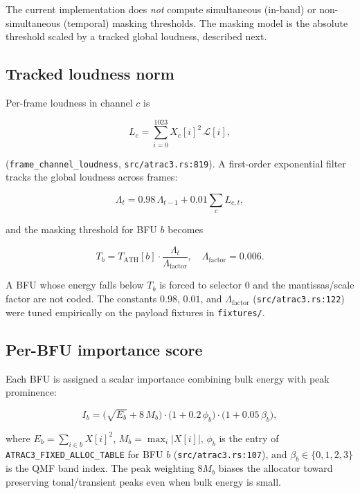 \documentclass[11pt]{article}
\begin{document}
The current implementation does \emph{not} compute simultaneous (in-band) or
non-simultaneous (temporal) masking thresholds. The masking model is the
absolute threshold scaled by a tracked global loudness, described next.

\subsection{Tracked loudness norm}

Per-frame loudness in channel \(c\) is

\begin{equation}
    L_c = \sum_{i=0}^{1023} X_c[i]^2 \,\mathcal{L}[i],
\end{equation}

\noindent
(\texttt{frame\_channel\_loudness}, \texttt{src/atrac3.rs:819}). A first-order
exponential filter tracks the global loudness across frames:

\begin{equation}
    \Lambda_t = 0.98\,\Lambda_{t-1} + 0.01 \sum_c L_{c,t},
\end{equation}

\noindent
and the masking threshold for BFU \(b\) becomes

\begin{equation}
    T_b = T_{\text{ATH}}[b] \cdot \frac{\Lambda_t}{\Lambda_{\text{factor}}},
    \quad \Lambda_{\text{factor}} = 0.006.
    \label{eq:masking}
\end{equation}

\noindent
A BFU whose energy falls below \(T_b\) is forced to selector \(0\) and the
mantissas/scale factor are not coded. The constants \(0.98\), \(0.01\), and
\(\Lambda_{\text{factor}}\) (\texttt{src/atrac3.rs:122}) were tuned
empirically on the payload fixtures in \texttt{fixtures/}.

\subsection{Per-BFU importance score}

Each BFU is assigned a scalar importance combining bulk energy with peak
prominence:

\begin{equation}
    I_b = \big(\sqrt{E_b} + 8\,M_b\big) \cdot \big(1 + 0.2\,\phi_b\big) \cdot \big(1 + 0.05\,\beta_b\big),
    \label{eq:importance}
\end{equation}

\noindent
where \(E_b = \sum_{i \in b} X[i]^2\), \(M_b = \max_i |X[i]|\), \(\phi_b\) is
the entry of \texttt{ATRAC3\_FIXED\_ALLOC\_TABLE} for BFU \(b\)
(\texttt{src/atrac3.rs:107}), and \(\beta_b \in \{0,1,2,3\}\) is the QMF band
index. The peak weighting \(8 M_b\) biases the allocator toward preserving
tonal/transient peaks even when bulk energy is small.
\end{document}
